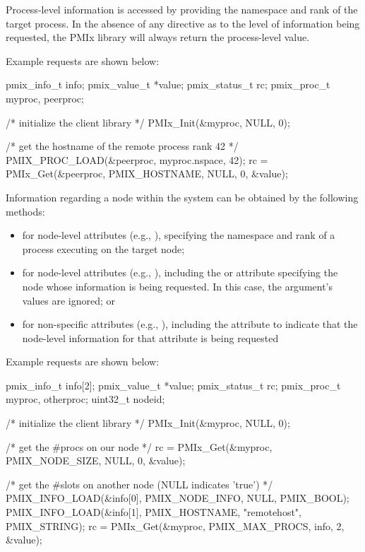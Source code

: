 
Process-level information is accessed by providing the namespace and rank of the target process. In the absence of any directive as to the level of information being requested, the \ac{PMIx} library will always return the process-level value.

Example requests are shown below:

\cspecificstart
\begin{codepar}
pmix_info_t info;
pmix_value_t *value;
pmix_status_t rc;
pmix_proc_t myproc, peerproc;

/* initialize the client library */
PMIx_Init(&myproc, NULL, 0);

/* get the hostname of the remote process rank 42 */
PMIX_PROC_LOAD(&peerproc, myproc.nspace, 42);
rc = PMIx_Get(&peerproc, PMIX_HOSTNAME, NULL, 0, &value);
\end{codepar}
\cspecificend


Information regarding a node within the system can be obtained by the following methods:

\begin{itemize}
\item for node-level attributes (e.g., ), specifying the namespace and rank of a process executing on the target node;
\item for node-level attributes (e.g., ), including the  or  attribute specifying the node whose information is being requested. In this case, the  argument's values are ignored; or
\item for non-specific attributes (e.g., ), including the  attribute to indicate that the node-level information for that attribute is being requested
\end{itemize}

Example requests are shown below:

\cspecificstart
\begin{codepar}
pmix_info_t info[2];
pmix_value_t *value;
pmix_status_t rc;
pmix_proc_t myproc, otherproc;
uint32_t nodeid;

/* initialize the client library */
PMIx_Init(&myproc, NULL, 0);

/* get the #procs on our node */
rc = PMIx_Get(&myproc, PMIX_NODE_SIZE, NULL, 0, &value);

/* get the #slots on another node (NULL indicates 'true') */
PMIX_INFO_LOAD(&info[0], PMIX_NODE_INFO, NULL, PMIX_BOOL);
PMIX_INFO_LOAD(&info[1], PMIX_HOSTNAME, "remotehost", PMIX_STRING);
rc = PMIx_Get(&myproc, PMIX_MAX_PROCS, info, 2, &value);

\end{codepar}
\cspecificend

